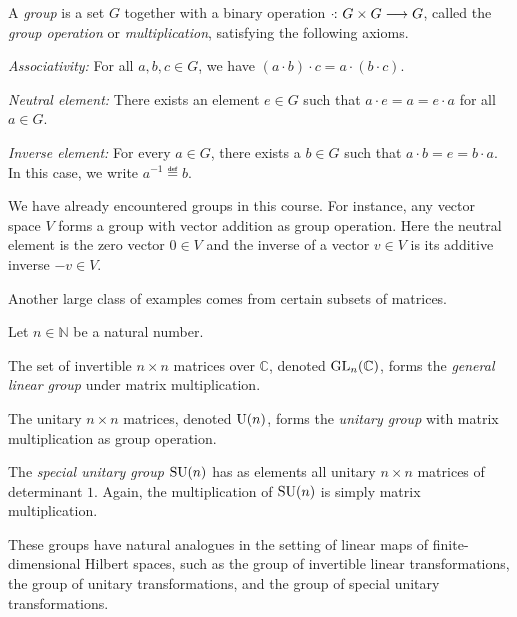 \documentclass[a4paper, oneside, 12pt]{amsart}
\begin{document}
\begin{definition}\label{def:group-for-special-sec}
  A \emph{group} is a set \( G \) together with a binary operation \( \cdot \from G \times G \to G \), called the \emph{group operation} or \emph{multiplication}, satisfying the following axioms.
  \begin{thmlist}
    \item \emph{Associativity:} For all \( a, b, c \in G \), we have \( (a \cdot b) \cdot c = a \cdot (b \cdot c) \).
    \item \emph{Neutral element:} There exists an element \( e \in G \) such that \( a \cdot e = a = e \cdot a \) for all \( a \in G \).
    \item \emph{Inverse element:} For every \( a \in G \), there exists a \( b \in G \) such that \( a \cdot b = e = b \cdot a \). In this case, we write \( a^{-1} \eqdef b \).
  \end{thmlist}
\end{definition}

We have already encountered groups in this course.
For instance, any vector space \( V \) forms a group with vector addition as group operation.
Here the neutral element is the zero vector \(0 \in V\) and the inverse of a vector \( v \in V \) is its additive inverse \( -v\in V \).
\bigskip

Another large class of examples comes from certain subsets of matrices.
\begin{example}\label{ex:invertible-matrices}
  Let \(n\in \mathbb{N}\) be a natural number.
  \begin{thmlist}
    \item The set of invertible \( n \times n \) matrices over \( \mathbb{C} \), denoted \( \operatorname{GL}_{n}(\mathbb{C}) \), forms the \emph{general linear group} under matrix multiplication.
    \item The unitary \( n \times n \) matrices, denoted \( \operatorname{U}(n) \), forms  the \emph{unitary group} with  matrix multiplication as group operation.
    \item The \emph{special unitary group} \(\operatorname{SU}(n)\) has as elements all unitary \( n \times n \) matrices of determinant \(1\).
    Again, the multiplication of \(\operatorname{SU}(n)\) is simply matrix multiplication.
  \end{thmlist}
\end{example}

These groups have natural analogues in the setting of linear maps of finite-dimensional Hilbert spaces, such as the group of invertible linear transformations, the group of unitary transformations, and the group of special unitary transformations.
\end{document}
